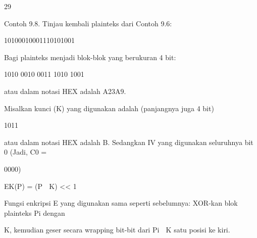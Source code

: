 \documentclass{article}
\begin{document}

29

Contoh 9.8. Tinjau kembali plainteks dari Contoh 9.6: 


10100010001110101001 

Bagi plainteks menjadi blok-blok yang berukuran 4 bit: 


1010  0010  0011  1010  1001 


atau  dalam notasi HEX adalah A23A9.  

Misalkan kunci (K) yang digunakan adalah (panjangnya juga 4 bit) 



1011 


atau dalam notasi HEX adalah B. Sedangkan IV yang digunakan seluruhnya bit 0 (Jadi, C0 = 

0000) 

EK(P) = (P  K) << 1

Fungsi enkripsi E yang digunakan sama seperti sebelumnya: XOR-kan blok plainteks Pi dengan 

K, kemudian geser secara wrapping bit-bit dari Pi  K satu posisi ke kiri.
\end{document}
